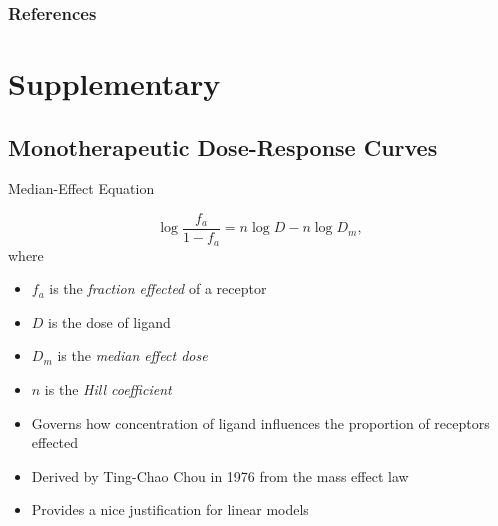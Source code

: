 \documentclass{beamer}
\begin{document}
\begin{frame}[allowframebreaks]
    \frametitle{References}
    
    
    \nocite{CHENG2021111652}
    \nocite{CHOU1976253}
    \nocite{Ianevski2020-sv}
    \nocite{drugcombdb}
    \nocite{synergyfinder}
\end{frame}

\section{Supplementary}


\subsection{Monotherapeutic Dose-Response Curves}

\begin{frame}{Median-Effect Equation}

    \begin{definition}
        \[
            \log\frac{f_a}{1 - f_a} = n\log D - n \log D_m,
        \]
        where
        \begin{itemize}
            \item $f_a$ is the \textit{fraction effected} of a receptor
            \item $D$ is the dose of ligand
            \item $D_m$ is the \textit{median effect dose}
            \item $n$ is the \textit{Hill coefficient}
        \end{itemize}
    \end{definition}

    \begin{itemize}
        \item Governs how concentration of ligand influences the proportion of receptors effected
        \item Derived by Ting-Chao Chou in 1976 from the mass effect law
        \item Provides a nice justification for linear models
    \end{itemize}
\end{frame}
\end{document}

